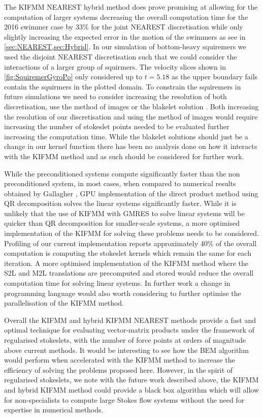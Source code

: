 The KIFMM NEAREST hybrid method does prove promising at allowing for the computation of larger systems decreasing the overall computation time for the 2016 swimmer case by 33\% for the joint NEAREST discretisation while only slightly increasing the expected error in the motion of the swimmers as see in \cref{sec:NEAREST,sec:Hybrid}. In our simulation of bottom-heavy squiremers we used the disjoint NEAREST discretisation such that we could consider the interactions of a larger group of squirmers. The velocity slices shown in \cref{fig:SquiremerGyroPo} only considered up to $t=5.18$ as the upper boundary fails contain the squirmers in the plotted domain. To constrain the squiremers in future simulations we need to consider increasing the resolution of both discretisation, use the method of images \cite{Ainley2008TheStokeslets} or the blakelet solution \cite{blake_1971,Cortez2015}. Both increasing the resolution of our discretisation and using the method of images would require increasing the number of stokeslet points needed to be evaluated further increasing the computation time. While the blakelet solutions should just be a change in our kernel function there has been no analysis done on how it interacts with the KIFMM method and as such should be considered for further work.    

While the preconditioned systems compute significantly faster than the non preconditioned system, in most cases, when compared to numerical results obtained by Gallagher \cite{Gallagher2020}, GPU implementation of the direct product method using QR decomposition solves the linear systems significantly faster. While it is unlikely that the use of KIFMM with GMRES to solve linear systems will be quicker than QR decomposition for smaller-scale systems, a more optimised implementation of the KIFMM for solving these problems needs to be considered. Profiling of our current implementation reports approximately 40\% of the overall computation is computing the stokeslet kernels which remain the same for each iteration. A more optimised implementation of the KIFMM method where the S2L and M2L translations are precomputed and stored would reduce the overall computation time for solving linear systems. In further work a change in programming language would also worth considering to further optimise the parallelisation of the KIFMM method. 

Overall the KIFMM and hybrid KIFMM NEAREST methods provide a fast and optimal technique for evaluating vector-matrix products under the framework of regularised stokeslets, with the number of force points at orders of magnitude above current methods. It would be interesting to see how the BEM algorithm would perform when accelerated with the KIFMM method \cite{Cao2012ABEM,Cao2015AAnalysis,Betcke2021Bempp-cl:Library.} to increase the efficiency of solving the problems proposed here. However, in the spirit of regularised stokeslets, we note with the future work described above, the KIFMM and hybrid KIFMM method could provide a black box algorithm which will allow for non-specialists to compute large Stokes flow systems without the need for expertise in numerical methods.